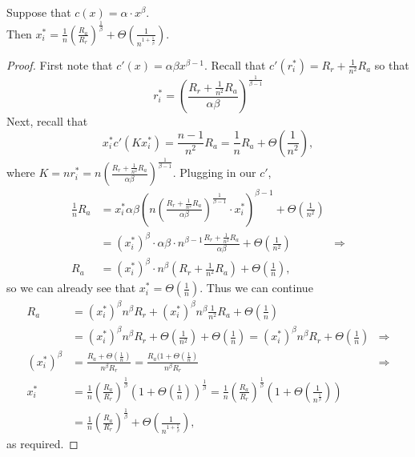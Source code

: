 \begin{proposition}
    Suppose that $c(x) = \alpha \cdot x^\beta$.\\
    Then $x^*_i=\frac1n (\frac{R_a}{R_r})^{\frac{1}{\beta}}+\Theta\left(\frac{1}{n^{1+\frac{1}{\beta}}}\right)$.
\end{proposition}
\begin{proof}
    First note that $c'(x)=\alpha\beta x^{\beta-1}$. 
    Recall that $c'(r^*_i)=R_r+\frac{1}{n^2}R_a$ so that 
    $$r^*_i = (\frac{R_r+\frac{1}{n^2}R_a}{\alpha\beta})^{\frac{1}{\beta-1}}%
    $$
    Next, recall that 
    $$x^*_i c'(K x^*_i) = \frac{n-1}{n^2}R_a = \frac{1}{n}R_a+ \Theta(\frac{1}{n^2}),$$
    where $K=nr^*_i = n(\frac{R_r+\frac{1}{n^2}R_a}{\alpha\beta})^{\frac{1}{\beta-1}} $.
    Plugging in our $c'$, 
    \begin{align*}
        \frac{1}{n}R_a& = x^*_i \alpha\beta \left(  n(\frac{R_r+\frac{1}{n^2}R_a}{\alpha\beta})^{\frac{1}{\beta-1}}\cdot x^*_i\right)^{\beta-1} + \Theta(\frac{1}{n^2})\\ 
        &=(x^*_i)^\beta\cdot \alpha\beta \cdot n^{\beta-1}\frac{R_r+\frac{1}{n^2}R_a}{\alpha\beta} + \Theta(\frac{1}{n^2})&\Rightarrow\\
        R_a &= (x^*_i)^\beta\cdot n^{\beta}(R_r+\frac{1}{n^2}R_a) + \Theta(\frac{1}{n}),
    \end{align*}
    so we can already see that $x^*_i=\Theta(\frac1n)$.
    Thus we can continue
    \begin{align*}
               R_a &= (x^*_i)^\beta n^{\beta}R_r+ (x^*_i)^\beta n^{\beta}\frac{1}{n^2}R_a + \Theta(\frac{1}{n}) \\
               &=(x^*_i)^\beta n^{\beta}R_r+ \Theta(\frac{1}{n^2}) + \Theta(\frac{1}{n})=(x^*_i)^\beta n^{\beta}R_r+ \Theta(\frac{1}{n})&\Rightarrow\\
               (x^*_i)^\beta &= \frac{R_a+\Theta(\frac{1}{n})}{n^\beta R_r} = \frac{R_a(1+\Theta(\frac1n)}{n^\beta R_r} &\Rightarrow\\
               x^*_i&=\frac1n\left(\frac{R_a}{R_r}\right)^{\frac1\beta}(1+\Theta(\frac1n))^{\frac1\beta}
               = \frac1n\left(\frac{R_a}{R_r}\right)^{\frac1\beta}\left(1+\Theta(\frac1{n^{\frac1\beta}})\right)\\
               &= \frac1n\left(\frac{R_a}{R_r}\right)^{\frac1\beta} +\Theta\left(\frac1{n^{1+\frac1\beta}}\right),
    \end{align*}
    as required.
\end{proof}
